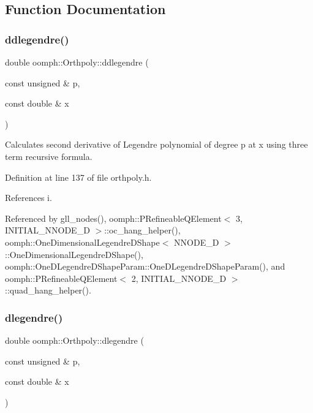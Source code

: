 \subsection{Function Documentation}
\mbox{\label{namespaceoomph_1_1Orthpoly_a560de3e87ebd12628426d853d8b4d5b3}} 
\subsubsection{\texorpdfstring{ddlegendre()}{ddlegendre()}}
{\footnotesize\ttfamily double oomph\+::\+Orthpoly\+::ddlegendre (\begin{DoxyParamCaption}\item[{const unsigned \&}]{p,  }\item[{const double \&}]{x }\end{DoxyParamCaption})\hspace{0.3cm}{\ttfamily [inline]}}



Calculates second derivative of Legendre polynomial of degree p at x using three term recursive formula. 



Definition at line 137 of file orthpoly.\+h.



References i.



Referenced by gll\+\_\+nodes(), oomph\+::\+P\+Refineable\+Q\+Element$<$ 3, I\+N\+I\+T\+I\+A\+L\+\_\+\+N\+N\+O\+D\+E\+\_\+D $>$\+::oc\+\_\+hang\+\_\+helper(), oomph\+::\+One\+Dimensional\+Legendre\+D\+Shape$<$ N\+N\+O\+D\+E\+\_\+D $>$\+::\+One\+Dimensional\+Legendre\+D\+Shape(), oomph\+::\+One\+D\+Legendre\+D\+Shape\+Param\+::\+One\+D\+Legendre\+D\+Shape\+Param(), and oomph\+::\+P\+Refineable\+Q\+Element$<$ 2, I\+N\+I\+T\+I\+A\+L\+\_\+\+N\+N\+O\+D\+E\+\_\+D $>$\+::quad\+\_\+hang\+\_\+helper().

\mbox{\label{namespaceoomph_1_1Orthpoly_a4062725a9af419d3c0a24927725e5435}} 
\subsubsection{\texorpdfstring{dlegendre()}{dlegendre()}}
{\footnotesize\ttfamily double oomph\+::\+Orthpoly\+::dlegendre (\begin{DoxyParamCaption}\item[{const unsigned \&}]{p,  }\item[{const double \&}]{x }\end{DoxyParamCaption})\hspace{0.3cm}{\ttfamily [inline]}}



